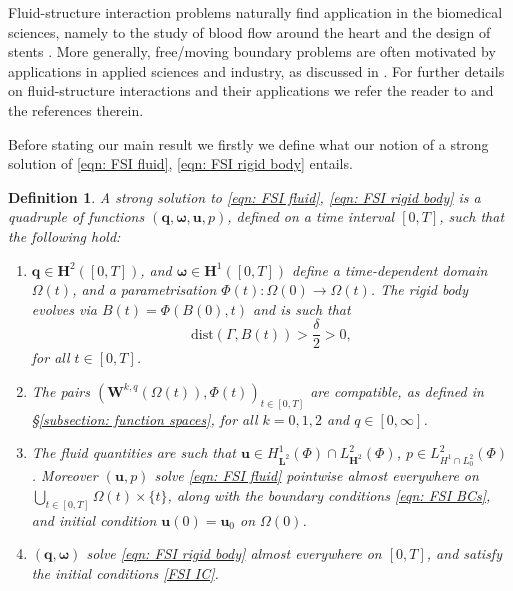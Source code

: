 \documentclass[a4paper]{amsart}
\numberwithin{equation}{section}
\theoremstyle{plain}
\newtheorem{definition}[theorem]{Definition}
\newcommand{\mbf}[1]{\mathbf{#1}}
\begin{document}
Fluid-structure interaction problems naturally find application in the biomedical sciences, namely to the study of blood flow around the heart \cite{astorino2009fluid,vcanic2014fluid,van2006fluid} and the design of stents \cite{vcanic2021next}.
More generally, free/moving boundary problems are often motivated by applications in applied sciences and industry, as discussed in \cite{EllOckBook82}.
For further details on fluid-structure interactions and their applications we refer the reader to \cite{vcanic2021moving,galdi2002motion} and the references therein.

Before stating our main result we firstly we define what our notion of a strong solution of \eqref{eqn: FSI fluid}, \eqref{eqn: FSI rigid body} entails.

\begin{definition}
    \label{defn: strong soln fsi}
    A strong solution to \eqref{eqn: FSI fluid}, \eqref{eqn: FSI rigid body} is a quadruple of functions $(\mbf{q}, \boldsymbol{\omega}, \mbf{u}, p)$, defined on a time interval $[0,T]$, such that the following hold:
    \begin{enumerate}
        \item $\mbf{q} \in \mbf{H}^2([0,T])$, and $\boldsymbol{\omega} \in \mbf{H}^1([0,T])$ define a time-dependent domain $\Omega(t)$, and a parametrisation $\Phi(t): \Omega(0) \rightarrow \Omega(t)$.
        The rigid body evolves via $B(t) = \Phi(B(0),t)$ and is such that 
        \[\mathrm{dist}(\Gamma, B(t)) > \frac{\delta}{2} > 0,\]
        for all $t \in [0,T]$.
        \item The pairs $(\mbf{W}^{k,q}(\Omega(t)),\Phi(t))_{t \in [0,T]}$ are compatible, as defined in \S\ref{subsection: function spaces}, for all $k = 0,1,2$ and $q \in [0,\infty]$.
        \item The fluid quantities are such that $\mbf{u} \in H^1_{\mbf{L}^2}(\Phi)\cap L^2_{\mbf{H}^2}(\Phi)$, $p \in L^2_{H^1 \cap L^2_0}(\Phi)$.
        Moreover $(\mbf{u}, p)$ solve \eqref{eqn: FSI fluid} pointwise almost everywhere on $\bigcup_{t \in [0,T]} \Omega(t) \times \{t\}$, along with the boundary conditions \eqref{eqn: FSI BCs}, and initial condition $\mbf{u}(0) = \mbf{u}_0$ on $\Omega(0)$.
        \item $(\mbf{q}, \boldsymbol{\omega})$ solve \eqref{eqn: FSI rigid body} almost everywhere on $[0,T]$, and satisfy the initial conditions \eqref{FSI IC}.
    \end{enumerate}
    
\end{definition}
\end{document}
